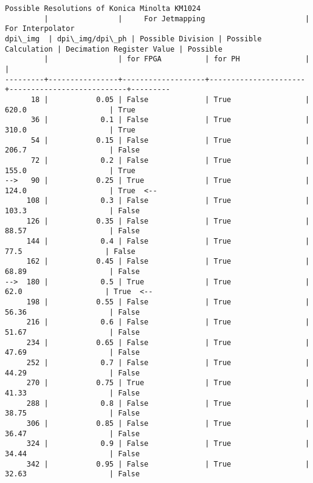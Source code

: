\documentclass{article}
\begin{document}
    \begin{Verbatim}[commandchars=\\\{\}]
Possible Resolutions of Konica Minolta KM1024
         |                |     For Jetmapping                       |      For Interpolator               
dpi\_img  | dpi\_img/dpi\_ph | Possible Division | Possible Calculation | Decimation Register Value | Possible
         |                | for FPGA          | for PH               |                           |         
---------+----------------+-------------------+----------------------+---------------------------+---------
      18 |           0.05 | False             | True                 |   620.0                   | True
      36 |            0.1 | False             | True                 |   310.0                   | True
      54 |           0.15 | False             | True                 |   206.7                   | False
      72 |            0.2 | False             | True                 |   155.0                   | True
-->   90 |           0.25 | True              | True                 |   124.0                   | True  <--
     108 |            0.3 | False             | True                 |   103.3                   | False
     126 |           0.35 | False             | True                 |   88.57                   | False
     144 |            0.4 | False             | True                 |    77.5                   | False
     162 |           0.45 | False             | True                 |   68.89                   | False
-->  180 |            0.5 | True              | True                 |    62.0                   | True  <--
     198 |           0.55 | False             | True                 |   56.36                   | False
     216 |            0.6 | False             | True                 |   51.67                   | False
     234 |           0.65 | False             | True                 |   47.69                   | False
     252 |            0.7 | False             | True                 |   44.29                   | False
     270 |           0.75 | True              | True                 |   41.33                   | False
     288 |            0.8 | False             | True                 |   38.75                   | False
     306 |           0.85 | False             | True                 |   36.47                   | False
     324 |            0.9 | False             | True                 |   34.44                   | False
     342 |           0.95 | False             | True                 |   32.63                   | False

\end{Verbatim}
\end{document}
